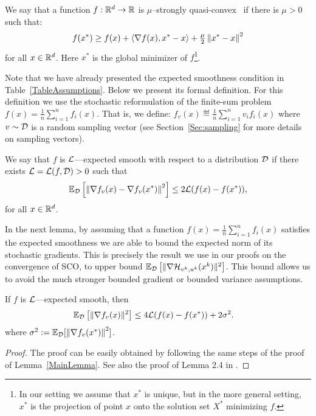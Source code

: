 \documentclass{article}
\begin{document}
\begin{definition}
\label{DefQSConvex}
We say that a function $f: \mathbb{R}^d \to \mathbb{R}$ is $\mu$--strongly quasi-convex~\citep{karimi2016linear, Necoara-Nesterov-Glineur-2018-linear-without-strong-convexity} if there is $\mu>0$ such that: 
\begin{equation}\label{eq:strconvexcons}
 f(x^*) \geq f(x)+ \left< \nabla f(x) , x^*-x\right> + \tfrac{\mu}{2} \left\| x^*-x\right\|^2
\end{equation}
for all $x \in \mathbb{R}^d$. Here $x^*$ is the global minimizer of $f$\footnote{In our setting we assume that $x^*$ is unique, but in the more general setting, $x^*$ is the projection of point $x$ onto the solution set $X^*$ minimizing $f$.}.
\end{definition}

Note that we have already presented the expected smoothness condition in Table~\ref{TableAssumptions}. Below we present its formal definition. For this definition we use the stochastic reformulation of the finite-sum problem $f(x) = \tfrac{1}{n} \sum_{i=1}^n f_i(x)$. That is, we define: $ f_v(x) \eqdef \frac{1}{n}\sum_{i=1}^n v_i f_i(x)$ where $v\sim{\cal D}$ is a random sampling vector (see Section~\ref{Sec:sampling} for more details on sampling vectors).

\begin{definition}
\label{ass:Expsmooth} We say that $f$ is ${\cal L}$---expected smooth with respect to a distribution ${\cal D}$ if there exists  ${\cal L}={\cal L}(f,{\cal D})>0$  such that
\begin{equation}
\label{eq:expsmooth}
{\mathbb{E}_{{\cal D}}\left[\left\| \nabla f_v(x)-\nabla f_v(x^*)\right\|^2\right] } \leq 2{\cal L} (f(x)-f(x^*)),
\end{equation}
for all $x\in\mathbb{R}^d$. 
\end{definition}

In the next lemma, by assuming that a function $f(x) = \tfrac{1}{n} \sum_{i=1}^n f_i(x)$ satisfies the expected smoothness we are able to bound the expected norm of its stochastic gradients. This is precisely the result we use in our proofs on the convergence of SCO, to upper bound $\mathbb{E}_{{\cal D}}   \left[ \|  \nabla {\cal H}_{v^k,u^k}(x^k)\|^2 \right]$. This bound allows us to avoid the much stronger bounded gradient or bounded variance assumptions.

\begin{lemma}
\label{lem:weakgrowth}
If $f$ is ${\cal L}$---expected smooth, then
\begin{align}
\label{upperbound}
\mathbb{E}_{{\cal D}} \left[ \|\nabla f_{v} (x)\|^2 \right] & \leq  4  {\cal L} ( f(x)-f(x^*) ) + 2 \sigma^2.
\end{align}
where  $\sigma^2  := \mathbb{E}_{{\cal D}}[\left\| \nabla f_v(x^*)\right\|^2]$.
\end{lemma}
\begin{proof}
The proof can be easily obtained by following the same steps of the proof of Lemma~\ref{MainLemma}. See also the proof of Lemma 2.4 in \cite{gower2019sgd}.
\end{proof}
\end{document}
